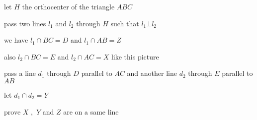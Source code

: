 let $ H $ the orthocenter of the triangle $ ABC $

pass two lines $ l_1 $ and $ l_2 $ through $ H $ such that $ l_1 \bot l_2 $

we have $ l_1 \cap BC = D $ and $ l_1 \cap AB = Z $

also $ l_2 \cap BC = E $ and $ l_2 \cap AC = X $ like this picture

pass a line $ d_1$ through $ D $ parallel to $ AC $ and another line $ d_2 $ through $ E $ parallel to $ AB $

let $ d_1 \cap d_2 = Y $

prove $ X $ $ , $ $ Y $ and $ Z $ are on a same line